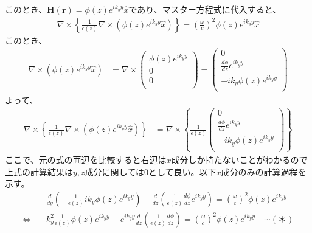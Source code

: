 \documentclass[a4paper,11pt,dvipdfmx]{jsarticle}
\begin{document}
\begin{enumerate}
    このとき、$\mathbf{H(r)} = \phi(z) e^{i k_y y} \hat{x}$であり、マスター方程式に代入すると、
    \begin{align*}
      \nabla \times  \left\{   \frac{1}{\epsilon(z)} \nabla \times (\phi(z) e^{i k_y y} \hat{x}) \right\} = \left( \frac{\omega}{c} \right)^2 \phi(z) e^{i k_y y} \hat{x}
    \end{align*}
    このとき、
    \begin{align*}
      \nabla \times \left( \phi(z) e^{ik_y y} \hat{x} \right) &= \nabla \times 
      \begin{pmatrix}
        \phi(z) e^{ik_y y} \\
        0 \\
        0 \\
      \end{pmatrix}
      = 
      \begin{pmatrix}
        0 \\
        \displaystyle \frac{d\phi}{dz}e^{ik_y y} \\
        -ik_y \phi(z) e^{ik_y y} \\
      \end{pmatrix}
    \end{align*}
    よって、
    \begin{align*}
      \nabla \times  \left\{   \frac{1}{\epsilon(z)} \nabla \times (\phi(z) e^{i k_y y} \hat{x}) \right\} &= \nabla \times \left\{ \frac{1}{\epsilon(z)} 
      \begin{pmatrix}
        0 \\
        \displaystyle \frac{d\phi}{dz}e^{ik_y y} \\
        -ik_y \phi(z) e^{ik_y y} \\
      \end{pmatrix}
      \right\}
    \end{align*}
    ここで、元の式の両辺を比較すると右辺は$x$成分しか持たないことがわかるので上式の計算結果は$y,z$成分に関しては0として良い。以下$x$成分のみの計算過程を示す。
    \begin{align*}
      &\frac{d}{dy} \left( -\frac{1}{\epsilon (z)} ik_y \phi (z) e^{ik_y y} \right) - \frac{d}{dz} \left( \frac{1}{\epsilon (z)} \frac{d \phi }{dz} e^{ik_y y} \right) = \left( \frac{ \omega }{c} \right)^2 \phi(z) e^{ik_y y}
      \\
      \Longleftrightarrow \quad &k_y^2 \frac{1}{\epsilon(z)}\phi(z)e^{ik_y y} - e^{ik_y y} \frac{d}{dz} \left( \frac{1}{\epsilon (z)} \frac{d \phi }{dz} \right) = \left( \frac{ \omega }{c} \right)^2 \phi(z) e^{ik_y y} \quad \cdots (＊) 

\end{align*}
\end{enumerate}
\end{document}
